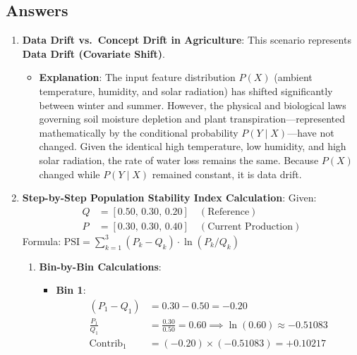 \subsection*{Answers}

\begin{enumerate}
    \item \textbf{Data Drift vs.\ Concept Drift in Agriculture}:
    This scenario represents \textbf{Data Drift (Covariate Shift)}.
    \begin{itemize}
        \item \textbf{Explanation}: The input feature distribution $P(X)$ (ambient temperature, humidity, and solar radiation) has shifted significantly between winter and summer. However, the physical and biological laws governing soil moisture depletion and plant transpiration---represented mathematically by the conditional probability $P(Y \mid X)$---have not changed. Given the identical high temperature, low humidity, and high solar radiation, the rate of water loss remains the same. Because $P(X)$ changed while $P(Y \mid X)$ remained constant, it is data drift.
    \end{itemize}

    \item \textbf{Step-by-Step Population Stability Index Calculation}:
    Given:
    \begin{align*}
    Q &= [0.50,\, 0.30,\, 0.20] \quad (\text{Reference}) \\
    P &= [0.30,\, 0.30,\, 0.40] \quad (\text{Current Production})
    \end{align*}
    Formula: $\text{PSI} = \sum_{k=1}^3 (P_k - Q_k) \cdot \ln(P_k / Q_k)$

    \begin{enumerate}
        \item \textbf{Bin-by-Bin Calculations}:
        \begin{itemize}
            \item \textbf{Bin 1}:
            \begin{align*}
            (P_1 - Q_1) &= 0.30 - 0.50 = -0.20 \\
            \frac{P_1}{Q_1} &= \frac{0.30}{0.50} = 0.60 \implies \ln(0.60) \approx -0.51083 \\
            \text{Contrib}_1 &= (-0.20) \times (-0.51083) = \mathbf{+0.10217}
            \end{align*}


\end{itemize}
\end{enumerate}
\end{enumerate}
